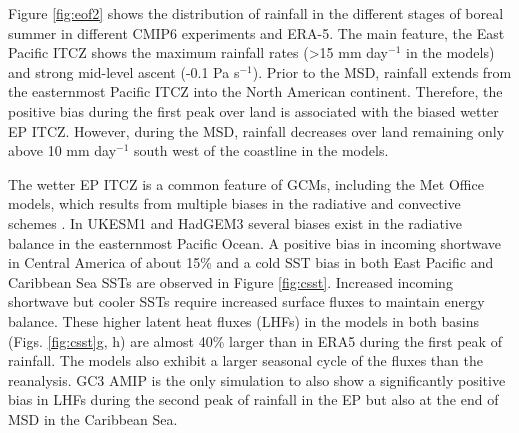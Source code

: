 Figure \ref{fig:eof2} shows the distribution of rainfall in the different stages of boreal summer in different CMIP6 experiments and ERA-5. 
The main feature, the East Pacific ITCZ shows the maximum rainfall rates (>15 mm day$^{-1}$ in the models) and strong mid-level ascent (-0.1 Pa s$^{-1}$). Prior to the MSD, rainfall extends from the easternmost Pacific ITCZ into the North American continent. Therefore, the positive bias during the first peak over land is associated with the biased wetter EP ITCZ.  However, during the MSD, rainfall decreases over land remaining only above 10 mm day$^{-1}$ south west of the coastline in the models.




The wetter EP ITCZ is a common feature of GCMs, including the Met Office models, which results from multiple biases in the radiative and convective schemes \citep{oueslati2013,li2014}. %
 In UKESM1 and HadGEM3 several biases exist in the radiative balance in the easternmost Pacific Ocean. A positive bias in incoming shortwave in Central America of about 15\% and a cold SST bias in both East Pacific and Caribbean Sea SSTs are observed in Figure \ref{fig:csst}. Increased incoming shortwave but cooler SSTs require increased surface fluxes to maintain energy balance. These higher latent heat fluxes (LHFs) in the models in both basins (Figs. \ref{fig:csst}g, h) are almost 40\% larger than in ERA5 during the first peak of rainfall. The models also exhibit a larger seasonal cycle of the fluxes than the reanalysis. GC3 AMIP is the only simulation to also show a significantly positive bias in LHFs during the second peak of rainfall in the EP but also at the end of MSD in the Caribbean Sea. 


